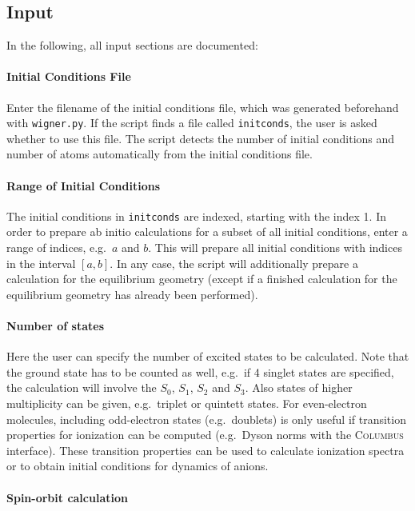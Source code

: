 \documentclass[a4paper,11pt,DIV=15,openany,twoside=false]{scrbook}
\newcommand{\ttt}[1]{\texttt{#1}}
\begin{document}
\subsection{Input}

In the following, all input sections are documented:

\paragraph{Initial Conditions File}

Enter the filename of the initial conditions file, which was generated beforehand with \ttt{wigner.py}. If the script finds a file called \ttt{initconds}, the user is asked whether to use this file. The script detects the number of initial conditions and number of atoms automatically from the initial conditions file.

\paragraph{Range of Initial Conditions}

The initial conditions in \ttt{initconds} are indexed, starting with the index 1. In order to prepare ab initio calculations for a subset of all initial conditions, enter a range of indices, e.g.\ $a$ and $b$. This will prepare all initial conditions with indices in the interval $[a,b]$. In any case, the script will additionally prepare a calculation for the equilibrium geometry (except if a finished calculation for the equilibrium geometry has already been performed).

\paragraph{Number of states}

Here the user can specify the number of excited states to be calculated. Note that the ground state has to be counted as well, e.g.\ if 4 singlet states are specified, the calculation will involve the $S_0$, $S_1$, $S_2$ and $S_3$. Also states of higher multiplicity can be given, e.g.\ triplet or quintett states. 
For even-electron molecules, including odd-electron states (e.g.\ doublets) is only useful if transition properties for ionization can be computed (e.g.\ Dyson norms with the \textsc{Columbus} interface). These transition properties can be used to calculate ionization spectra or to obtain initial conditions for dynamics of anions.

\paragraph{Spin-orbit calculation}
\end{document}
